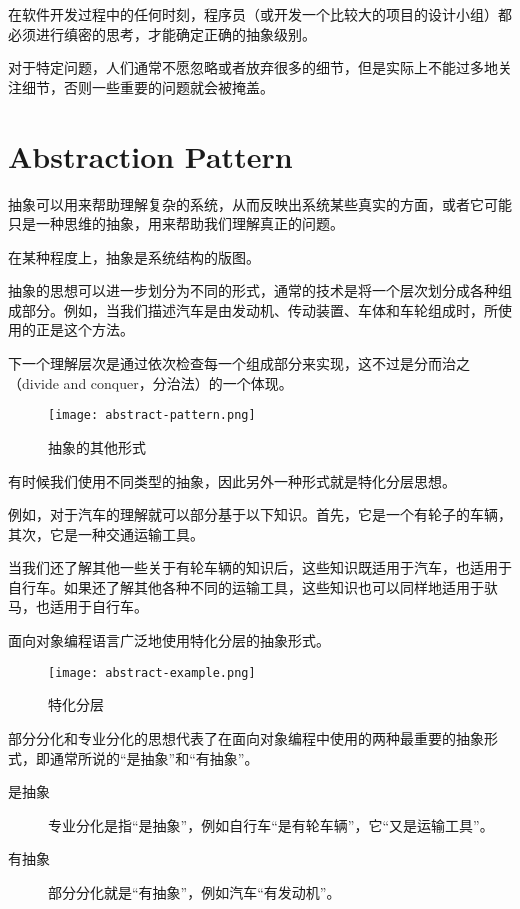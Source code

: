 在软件开发过程中的任何时刻，程序员（或开发一个比较大的项目的设计小组）都必须进行缜密的思考，才能确定正确的抽象级别。

对于特定问题，人们通常不愿忽略或者放弃很多的细节，但是实际上不能过多地关注细节，否则一些重要的问题就会被掩盖。


\section{Abstraction Pattern}

抽象可以用来帮助理解复杂的系统，从而反映出系统某些真实的方面，或者它可能只是一种思维的抽象，用来帮助我们理解真正的问题。

在某种程度上，抽象是系统结构的版图。

抽象的思想可以进一步划分为不同的形式，通常的技术是将一个层次划分成各种组成部分。例如，当我们描述汽车是由发动机、传动装置、车体和车轮组成时，所使用的正是这个方法。

下一个理解层次是通过依次检查每一个组成部分来实现，这不过是分而治之（divide and conquer，分治法）的一个体现。

\begin{figure}[htbp]
\centering
\texttt{[image: abstract-pattern.png]}
\caption{抽象的其他形式}
\label{fig:abstract-pattern}
\end{figure}

有时候我们使用不同类型的抽象，因此另外一种形式就是特化分层思想。

例如，对于汽车的理解就可以部分基于以下知识。首先，它是一个有轮子的车辆，其次，它是一种交通运输工具。

当我们还了解其他一些关于有轮车辆的知识后，这些知识既适用于汽车，也适用于自行车。如果还了解其他各种不同的运输工具，这些知识也可以同样地适用于驮马，也适用于自行车。

面向对象编程语言广泛地使用特化分层的抽象形式。

\begin{figure}[htbp]
\centering
\texttt{[image: abstract-example.png]}
\caption{特化分层}
\label{fig:abstract-example}
\end{figure}

部分分化和专业分化的思想代表了在面向对象编程中使用的两种最重要的抽象形式，即通常所说的“是抽象”和“有抽象”。

\begin{description}
\item[是抽象]

专业分化是指“是抽象”，例如自行车“是有轮车辆”，它“又是运输工具”。

\item[有抽象]

部分分化就是“有抽象”，例如汽车“有发动机”。
\end{description}

